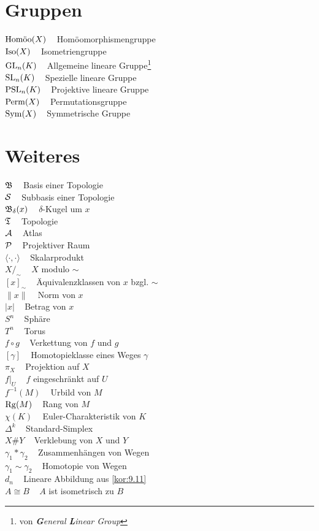 \section*{Gruppen}
$\Homoo(X)\;\;\;$ Homöomorphismengruppe\\
$\Iso(X)\;\;\;$ Isometriengruppe\\
$\GL_n(K)\;\;\;$ Allgemeine lineare Gruppe\footnote{von \textit{\textbf{G}eneral \textbf{L}inear Group}}\\
$\SL_n(K)\;\;\;$ Spezielle lineare Gruppe\\
$\PSL_n(K)\;\;\;$ Projektive lineare Gruppe\\
$\Perm(X)\;\;\;$ Permutationsgruppe\\
$\Sym(X)\;\;\;$ Symmetrische Gruppe
\section*{Weiteres}
$\fB\;\;\;$ Basis einer Topologie\\
$\calS\;\;\;$ Subbasis einer Topologie\\
$\fB_\delta(x)\;\;\;$ $\delta$-Kugel um $x$\\
$\fT\;\;\;$ Topologie\\

$\atlas\;\;\;$ Atlas\\
$\praum\;\;\;$ Projektiver Raum\\
$\langle \cdot , \cdot \rangle\;\;\;$ Skalarprodukt\\
$X /_\sim\;\;\;$ $X$ modulo $\sim$\\
$[x]_\sim\;\;\;$ Äquivalenzklassen von $x$ bzgl. $\sim$\\
$\| x \|\;\;\;$ Norm von $x$\\
$| x |\;\;\;$ Betrag von $x$\\

$S^n\;\;\;$ Sphäre\\
$T^n\;\;\;$ Torus\\

$f \circ g\;\;\;$ Verkettung von $f$ und $g$\\
$[\gamma]\;\;\;$ Homotopieklasse eines Weges $\gamma$\\
$\pi_X\;\;\;$ Projektion auf $X$\\
$f|_U\;\;\;$ $f$ eingeschränkt auf $U$\\
$f^{-1}(M)\;\;\;$ Urbild von $M$\\
$\Rg(M)\;\;\;$ Rang von $M$\\
$\chi(K)\;\;\;$ Euler-Charakteristik von $K$\\
$\Delta^k\;\;\;$ Standard-Simplex\\
$X \# Y\;\;\;$ Verklebung von $X$ und $Y$\\
$\gamma_1 * \gamma_2\;\;\;$ Zusammenhängen von Wegen\\
$\gamma_1 \sim \gamma_2\;\;\;$ Homotopie von Wegen\\
$d_n\;\;\;$ Lineare Abbildung aus \cref{kor:9.11}\\
$A \cong B\;\;\;$ $A$ ist isometrisch zu $B$
\onecolumn

